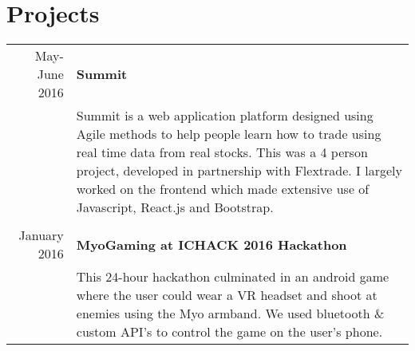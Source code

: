 \documentclass[a4paper,10pt]{article}
\begin{document}
	\section*{Projects}
	
	\begin{tabular}{r|p{12cm}}
		
		May-June 2016  & \textbf{Summit} \\& Summit is a web application platform designed using Agile methods to help people learn how to trade using real time data from real stocks. This was a 4 person project, developed in partnership with Flextrade. I largely worked on the frontend which made extensive use of Javascript, React.js and Bootstrap.
		\\\multicolumn{2}{c}{} \\
		
		January 2016 & \textbf{MyoGaming at ICHACK 2016 Hackathon} \\&
		This 24-hour hackathon culminated in an android game where the user could wear a VR headset and shoot at enemies using the Myo armband. We used bluetooth \& custom API's to control the game on the user's phone.
	\end{tabular}

	
	
	
\end{document}
